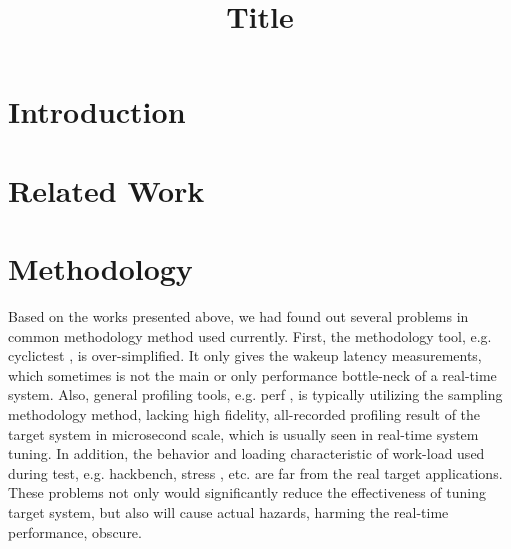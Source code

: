 \documentclass[conference]{IEEEtran}
\begin{document}
\title{Title}

\author{
\and
{}
}

\maketitle

\begin{abstract}
\end{abstract}

\section{Introduction}

\section{Related Work}

\section{Methodology}

    Based on the works presented above, we had found out several problems in common methodology method used currently.
    First, the methodology tool, e.g. cyclictest \cite{cyclictest} \cite{rt-tests}, is over-simplified. It only gives the wakeup latency
    measurements, which sometimes is not the main or only performance bottle-neck of a real-time system. Also, general
    profiling tools, e.g. perf \cite{perf}, is typically utilizing the sampling methodology method, lacking high
    fidelity, all-recorded profiling result of the target system in microsecond scale, which is usually seen in
    real-time system tuning. In addition, the behavior and loading characteristic of work-load used during test, e.g.
    hackbench, stress \cite{rt-tests}, etc. are far from the real target applications. These problems
    not only would significantly reduce the effectiveness of tuning target system, but also will cause actual hazards,
    harming the real-time performance, obscure.
\end{document}
